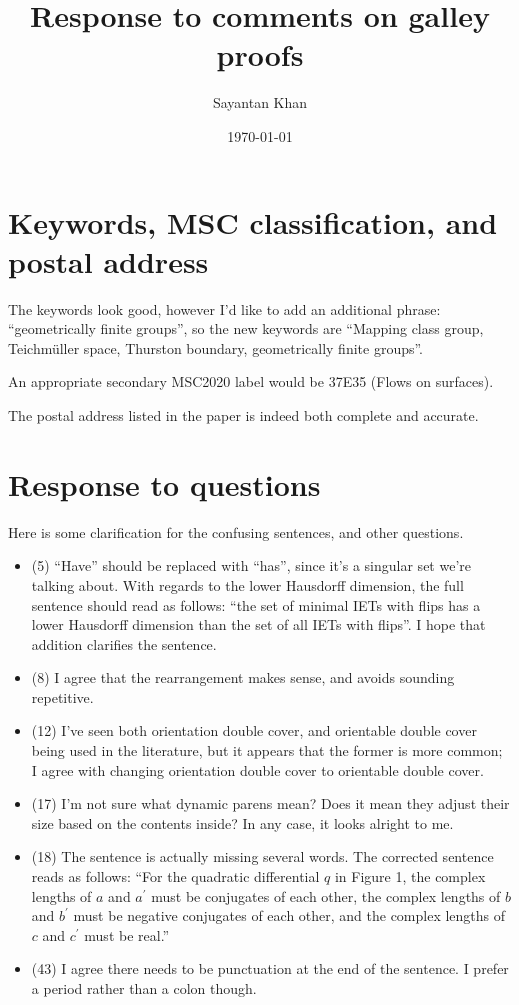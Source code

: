 \documentclass[12pt, reqno]{amsart}
\title{Response to comments on galley proofs}
\author{Sayantan Khan}
\date{\today}
\begin{document}
\maketitle

\section{Keywords, MSC classification, and postal address}
\label{sec:keyw-msc-class}

The keywords look good, however I'd like to add an additional phrase: ``geometrically finite groups'', so the new keywords are ``Mapping class group, Teichmüller space, Thurston boundary, geometrically finite groups''.

An appropriate secondary MSC2020 label would be 37E35 (Flows on surfaces).

The postal address listed in the paper is indeed both complete and accurate.

\section{Response to questions}
\label{sec:sugg-chang}

Here is some clarification for the confusing sentences, and other questions.
\begin{itemize}
\item (5) ``Have'' should be replaced with ``has'', since it's a singular set we're talking about. With regards to the lower Hausdorff dimension, the full sentence should read as follows: ``the set of minimal IETs with flips has a lower Hausdorff dimension than the set of all IETs with flips''. I hope that addition clarifies the sentence.
\item (8) I agree that the rearrangement makes sense, and avoids sounding repetitive.
\item (12) I've seen both orientation double cover, and orientable double cover being used in the literature, but it appears that the former is more common; I agree with changing orientation double cover to orientable double cover.
\item (17) I'm not sure what dynamic parens mean? Does it mean they adjust their size based on the contents inside? In any case, it looks alright to me.
\item (18) The sentence is actually missing several words. The corrected sentence reads as follows: ``For the quadratic differential $q$ in Figure 1, the complex lengths of $a$ and $a^{\prime}$ must be conjugates of each other, the complex lengths of $b$ and $b^{\prime}$ must be negative conjugates of each other, and the complex lengths of $c$ and $c^{\prime}$ must be real.''
\item (43) I agree there needs to be punctuation at the end of the sentence. I prefer a period rather than a colon though.
\end{itemize}
\end{document}
